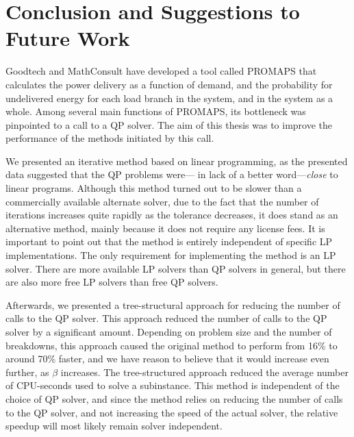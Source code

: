 \documentclass[a4paper,12pt]{report}
\begin{document}







\chapter{Conclusion and Suggestions to Future Work}
Goodtech and MathConsult have developed a tool called PROMAPS that calculates
the power delivery as a function of demand, and the probability for undelivered
energy for each load branch in the system, and in the system as a whole.
Among several main functions of PROMAPS, its bottleneck was pinpointed to
a call to a QP solver. The aim of this thesis was to improve the performance
of the methods initiated by this call.

We presented an iterative method based on linear programming, as the
presented data suggested that the QP problems were--- in lack of a better
word---\emph{close} to linear programs. Although this method turned out to be
slower than a commercially available alternate solver, due to the fact that the
number of iterations increases quite rapidly as the tolerance decreases, it
does stand as an alternative method, mainly because it does not require
any license fees.
It is important
to point out that the method is entirely independent of specific LP
implementations. The only requirement for implementing the method is an LP
solver. There are more available LP solvers than QP solvers in general,
but there are also more free LP solvers than free QP
solvers\cite{wikilp}\cite{wikiqp}.

Afterwards, we presented a tree-structural approach for reducing the number
of calls to the QP solver. This approach reduced the number of calls to the
QP solver by a significant amount. Depending on problem size and the number
of breakdowns, this approach caused the original method to perform from
16\% to around 70\% faster, and we have reason to believe that it would increase
even further, as $\beta$ increases. The tree-structured approach reduced the
average number of CPU-seconds used to solve a subinstance.
This method is
independent of the choice of QP solver, and since the method relies on reducing
the number of calls to the QP solver, and not increasing the speed of the
actual solver, the relative speedup will most likely remain solver independent.
\end{document}
